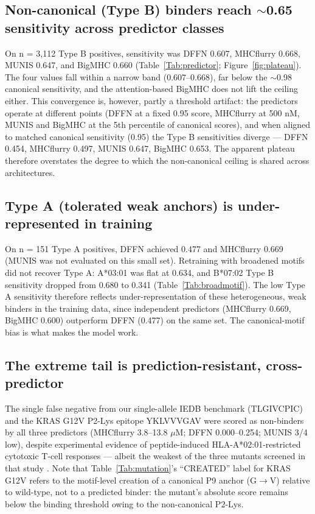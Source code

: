 \subsection{Non-canonical (Type B) binders reach $\sim$0.65 sensitivity across predictor classes}
On n = 3,112 Type B positives, sensitivity was DFFN 0.607, MHCflurry 0.668, MUNIS 0.647, and BigMHC 0.660 (Table~\ref{Tab:predictor}; Figure~\ref{fig:plateau}). The four values fall within a narrow band (0.607--0.668), far below the $\sim$0.98 canonical sensitivity, and the attention-based BigMHC does not lift the ceiling either. This convergence is, however, partly a threshold artifact: the predictors operate at different points (DFFN at a fixed 0.95 score, MHCflurry at 500 nM, MUNIS and BigMHC at the 5th percentile of canonical scores), and when aligned to matched canonical sensitivity (0.95) the Type B sensitivities diverge --- DFFN 0.454, MHCflurry 0.497, MUNIS 0.647, BigMHC 0.653. The apparent plateau therefore overstates the degree to which the non-canonical ceiling is shared across architectures.

\subsection{Type A (tolerated weak anchors) is under-represented in training}
On n = 151 Type A positives, DFFN achieved 0.477 and MHCflurry 0.669 (MUNIS was not evaluated on this small set). Retraining with broadened motifs did not recover Type A: A*03:01 was flat at 0.634, and B*07:02 Type B sensitivity dropped from 0.680 to 0.341 (Table~\ref{Tab:broadmotif}). The low Type A sensitivity therefore reflects under-representation of these heterogeneous, weak binders in the training data, since independent predictors (MHCflurry 0.669, BigMHC 0.600) outperform DFFN (0.477) on the same set. The canonical-motif bias is what makes the model work.

\subsection{The extreme tail is prediction-resistant, cross-predictor}
The single false negative from our single-allele IEDB benchmark (TLGIVCPIC) and the KRAS G12V P2-Lys epitope YKLVVVGAV were scored as non-binders by all three predictors (MHCflurry 3.8--13.8 $\mu$M; DFFN 0.000--0.254; MUNIS 3/4 low), despite experimental evidence of peptide-induced HLA-A*02:01-restricted cytotoxic T-cell responses --- albeit the weakest of the three mutants screened in that study \citep{Wu20}. Note that Table~\ref{Tab:mutation}'s ``CREATED'' label for KRAS G12V refers to the motif-level creation of a canonical P9 anchor (G$\rightarrow$V) relative to wild-type, not to a predicted binder: the mutant's absolute score remains below the binding threshold owing to the non-canonical P2-Lys.


